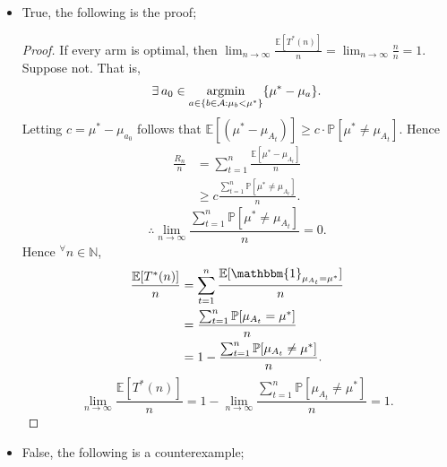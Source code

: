\documentclass[10pt]{article}
\theoremstyle{definition}
\newenvironment{solution*}[1]{%
  \IfBlankTF{#1}
    {\renewcommand{\themanualsolutioninner}{\unskip}}
    {\renewcommand\themanualsolutioninner{#1}}%
  \manualsolutioninner
}{\endmanualsolutioninner}
\DeclareMathOperator*{\argmin}{argmin}
\begin{document}
\begin{solution*}{}
    \begin{itemize}
        \item[(a)] True, the following is the proof;
        \begin{proof}
            If every arm is optimal, then $\lim_{n \rightarrow \infty} \frac{\mathbb{E}[T^*(n)]}{n} = \lim_{n \rightarrow \infty} \frac{n}{n} = 1$.
            Suppose not. That is, 
            \begin{equation*}
                \exists \hspace{0.2em} a_0 \in \argmin_{a \in \{b \in \mathcal{A} : \mu_b < \mu^* \}} \{\mu^* - \mu_a\}.
            \end{equation*} 
            Letting $c = \mu^* - \mu_{a_0}$ follows that $ \mathbb{E}[(\mu^* - \mu_{A_t})] \geq c \cdot \mathbb{P}[\mu^* \neq \mu_{A_t}]$.
            Hence 
            \begin{align*}
                \frac{R_n}{n} &= \sum_{t=1}^n \frac{\mathbb{E}[\mu^* - \mu_{A_t}]}{n} \\
                &\geq c \frac{\sum_{t=1}^n \mathbb{P}[\mu^* \neq \mu_{A_t}]}{n}.
            \end{align*}
            \begin{equation*}
                \therefore \lim_{n \rightarrow \infty}\frac{\sum_{t=1}^n \mathbb{P}[\mu^* \neq \mu_{A_t}]}{n} = 0.
            \end{equation*}
            Hence $^\forall n \in \mathbb{N}$,
            \begin{align*}
                \frac{\mathbb{E}[T^* (n)]}{n} &= \sum_{t=1}^n \frac{\mathbb{E}[\mathbbm{1}_{\mu_{A_t} = \mu^*}]}{n} \\
                &= \frac{\sum_{t=1}^{n}\mathbb{P}[\mu_{A_t} = \mu^*]}{n} \\
                &= 1 - \frac{\sum_{t=1}^{n}\mathbb{P}[\mu_{A_t} \neq \mu^*]}{n}.
            \end{align*}
            \begin{equation*}
                \lim_{n \rightarrow \infty} \frac{\mathbb{E}[T^* (n)]}{n} = 1 - \lim_{n \rightarrow \infty} \frac{\sum_{t=1}^{n}\mathbb{P}[\mu_{A_t} \neq \mu^*]}{n} = 1.
            \end{equation*}
        \end{proof}
        \item[(b)] False, the following is a counterexample;
        

\end{itemize}
\end{solution*}
\end{document}
